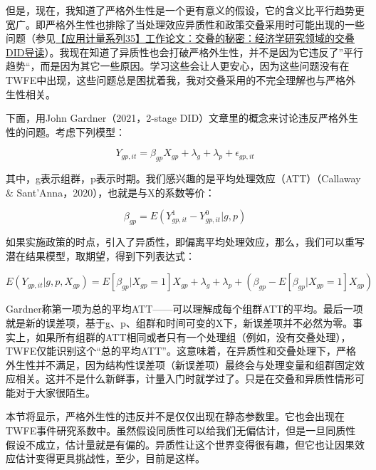 \documentclass[cn,12pt,math=newtx,citestyle=gb7714-2015,bibstyle=gb7714-2015]{elegantbook}
\begin{document}
	    但是，现在，我知道了严格外生性是一个更有意义的假设，它的含义比平行趋势更宽广。即严格外生性也排除了当处理效应异质性和政策交叠采用时可能出现的一些问题（参见\href{https://mp.weixin.qq.com/s?__biz=MzAwODY5MDA3NA==&mid=2455734924&idx=1&sn=5990e3522a6a5288134d9205c1fe163b&chksm=8cc02a79bbb7a36f2f86680b85f4fb336c7469e7b187e2c1f8bb9165729a7097164488e729a5&scene=21#wechat_redirect}{【应用计量系列35】工作论文：交叠的秘密：经济学研究领域的交叠DID导读}）。我现在知道了异质性也会打破严格外生性，并不是因为它违反了”平行趋势“，而是因为其它一些原因。学习这些会让人更安心，因为这些问题没有在TWFE中出现，这些问题总是困扰着我，我对交叠采用的不完全理解也与严格外生性相关。
	    
	    下面，用John Gardner（2021，2-stage  DID）文章里的概念来讨论违反严格外生性的问题。考虑下列模型：
	    
	    \begin{equation}
	    	Y_{gp,it}=\beta_{gp}X_{gp}+\lambda_{g}+\lambda_p+\epsilon_{gp,it}
	    \end{equation}
	   
	其中，g表示组群，p表示时期。我们感兴趣的是平均处理效应（ATT）（Callaway \& Sant'Anna，2020），也就是与X的系数等价：
	
	\begin{equation}
		\beta_{gp}=E(Y_{gp,it}^1-Y_{gp,it}^0| g,p)
	\end{equation}
	
	如果实施政策的时点，引入了异质性，即偏离平均处理效应，那么，我们可以重写潜在结果模型，取期望，得到下列表达式：
	
	\begin{equation}
		E(Y_{gp,it} |g,p,X_{gp})=E[\beta_{gp}|X_{gp}=1]X_{gp}+\lambda_{g}+\lambda_p+(\beta_{gp}-E[\beta_{gp}|X_{gp}=1]X_{gp})
	\end{equation}
	
	Gardner称第一项为总的平均ATT——可以理解成每个组群ATT的平均。最后一项就是新的误差项，基于g、p、组群和时间可变的X下，新误差项并不必然为零。事实上，如果所有组群的ATT相同或者只有一个处理组（例如，没有交叠处理），TWFE仅能识别这个“总的平均ATT”。这意味着，在异质性和交叠处理下，严格外生性并不满足，因为结构性误差项（新误差项）最终会与处理变量和组群固定效应相关。这并不是什么新鲜事，计量入门时就学过了。只是在交叠和异质性情形可能对于大家很陌生。
	
	本节将显示，严格外生性的违反并不是仅仅出现在静态参数里。它也会出现在TWFE事件研究系数中。虽然假设同质性可以给我们无偏估计，但是一旦同质性假设不成立，估计量就是有偏的。异质性让这个世界变得很有趣，但它也让因果效应估计变得更具挑战性，至少，目前是这样。
	
\end{document}
